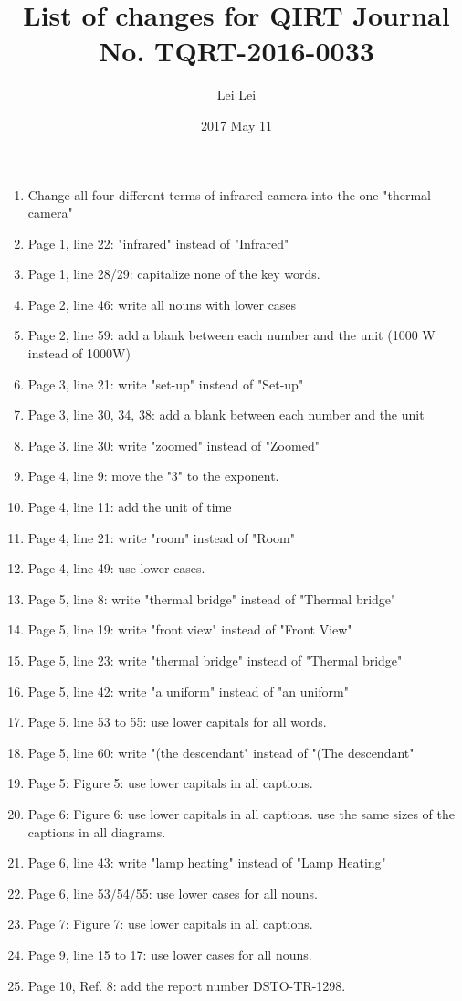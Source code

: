 \documentclass[letter]{article}
\begin{document}
    
\title{List of changes for QIRT Journal No. TQRT-2016-0033}
\author{Lei Lei}
\date{2017 May 11}

\maketitle


\begin{enumerate}
    \item Change all four different terms of infrared camera into the one "thermal camera"
    \item Page 1, line 22: "infrared" instead of "Infrared"
    \item Page 1, line 28/29: capitalize none of the key words.
    \item Page 2, line 46: write all nouns with lower cases 
    \item Page 2, line 59: add a blank between each number and the unit (1000 W instead of 1000W) 
    \item Page 3, line 21: write "set-up" instead of "Set-up"
    \item Page 3, line 30, 34, 38: add a blank between each number and the unit 
    \item Page 3, line 30: write "zoomed" instead of "Zoomed"
    \item Page 4, line 9: move the "3" to the exponent.
    \item Page 4, line 11: add the unit of time 
    \item Page 4, line 21: write "room" instead of "Room"
    \item Page 4, line 49: use lower cases.
    \item Page 5, line 8: write "thermal bridge" instead of "Thermal bridge"
    \item Page 5, line 19: write "front view" instead of "Front View"
    \item Page 5, line 23: write "thermal bridge" instead of "Thermal bridge"
    \item Page 5, line 42: write "a uniform" instead of "an uniform"
    \item Page 5, line 53 to 55: use lower capitals for all words.
    \item Page 5, line 60: write "(the descendant" instead of "(The descendant"
    \item Page 5: Figure 5: use lower capitals in all captions.
    \item Page 6: Figure 6: use lower capitals in all captions. use the same sizes of the captions in all diagrams.
    \item Page 6, line 43: write "lamp heating" instead of "Lamp Heating"
    \item Page 6, line 53/54/55: use lower cases for all nouns.
    \item Page 7: Figure 7: use lower capitals in all captions.
    \item Page 9, line 15 to 17: use lower cases for all nouns.
    \item Page 10, Ref. 8: add the report number  DSTO-TR-1298.

\end{enumerate}
\end{document}
